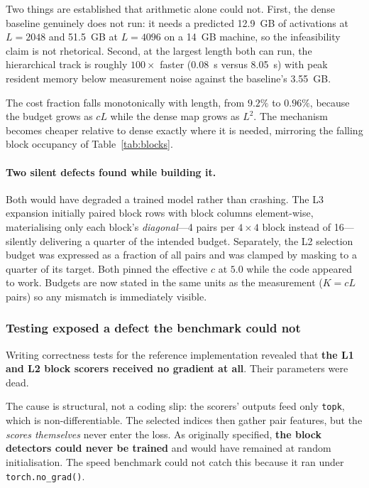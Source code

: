 \documentclass[11pt,a4paper]{article}
\begin{document}
Two things are established that arithmetic alone could not. First, the dense
baseline genuinely does not run: it needs a predicted 12.9~GB of activations at
$L=2048$ and 51.5~GB at $L=4096$ on a 14~GB machine, so the infeasibility claim
is not rhetorical. Second, at the largest length both can run, the hierarchical
track is roughly $100\times$ faster (0.08~s versus 8.05~s) with peak resident
memory below measurement noise against the baseline's 3.55~GB.

The cost fraction falls monotonically with length, from $9.2\%$ to $0.96\%$,
because the budget grows as $cL$ while the dense map grows as $L^2$. The
mechanism becomes cheaper relative to dense exactly where it is needed,
mirroring the falling block occupancy of Table~\ref{tab:blocks}.

\paragraph{Two silent defects found while building it.} Both would have degraded
a trained model rather than crashing. The L3 expansion initially paired block
rows with block columns element-wise, materialising only each block's
\emph{diagonal}---4 pairs per $4\times4$ block instead of 16---silently
delivering a quarter of the intended budget. Separately, the L2 selection budget
was expressed as a fraction of all pairs and was clamped by masking to a quarter
of its target. Both pinned the effective $c$ at $5.0$ while the code appeared to
work. Budgets are now stated in the same units as the measurement ($K = cL$
pairs) so any mismatch is immediately visible.

\subsubsection{Testing exposed a defect the benchmark could not}

Writing correctness tests for the reference implementation revealed that
\textbf{the L1 and L2 block scorers received no gradient at all}. Their
parameters were dead.

The cause is structural, not a coding slip: the scorers' outputs feed only
\texttt{topk}, which is non-differentiable. The selected indices then gather pair
features, but the \emph{scores themselves} never enter the loss. As originally
specified, \textcolor{risk}{\textbf{the block detectors could never be trained}}
and would have remained at random initialisation. The speed benchmark could not
catch this because it ran under \texttt{torch.no\_grad()}.
\end{document}
